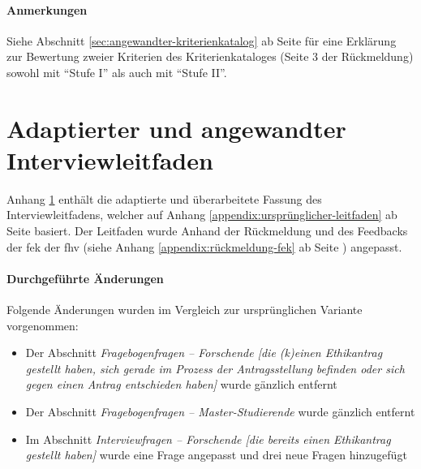 \documentclass[a4paper,12pt,twoside]{scrreprt}
\begin{document}
\subsubsection*{Anmerkungen}
\label{appendix:anmerkungen-rückmeldung-fek}

Siehe Abschnitt \ref{sec:angewandter-kriterienkatalog} ab Seite \pageref{sec:angewandter-kriterienkatalog} für eine Erklärung zur Bewertung zweier Kriterien des Kriterienkataloges (Seite 3 der Rückmeldung) sowohl mit \enquote{Stufe I} als auch mit \enquote{Stufe II}.



\chapter{Adaptierter und angewandter Interviewleitfaden}
\label{appendix:interview-leitfaden}

Anhang \ref{appendix:interview-leitfaden} enthält die adaptierte und überarbeitete Fassung des Interviewleitfadens, welcher auf Anhang \ref{appendix:ursprünglicher-leitfaden} ab Seite \pageref{appendix:ursprünglicher-leitfaden} basiert. Der Leitfaden wurde Anhand der Rückmeldung und des Feedbacks der \acl{fek} der \acl{fhv} (siehe Anhang \ref{appendix:rückmeldung-fek} ab Seite \pageref{appendix:rückmeldung-fek}) angepasst.

\subsubsection*{Durchgeführte Änderungen}
\label{appendix:änderungen-interview-leitfaden}

Folgende Änderungen wurden im Vergleich zur ursprünglichen Variante vorgenommen:
\begin{itemize}
    \item Der Abschnitt \textit{Fragebogenfragen -- Forschende [die (k)einen Ethikantrag gestellt haben, sich gerade im Prozess der Antragsstellung befinden oder sich gegen einen Antrag entschieden haben]} wurde gänzlich entfernt
    \item Der Abschnitt \textit{Fragebogenfragen -- Master-Studierende} wurde gänzlich entfernt
    \item Im Abschnitt \textit{Interviewfragen -- Forschende [die bereits einen Ethikantrag gestellt haben]} wurde eine Frage angepasst und drei neue Fragen hinzugefügt
\end{itemize}
\end{document}
